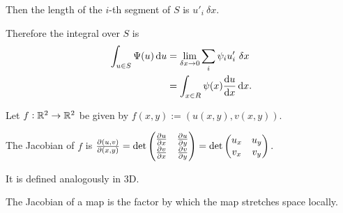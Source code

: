 Then the length of the $i$-th segment of $S$ is $u'_i ~\delta x$.

Therefore the integral over $S$ is
\begin{align*}
  \int_{u \in S} \Psi(u) \du &= \lim_{\delta x \to 0} \sum_i \psi_iu'_i~\delta x\\
                            &= \int_{x \in R} \psi(x)\frac{\du}{\dx}\dx.
\end{align*}

\newpage
\begin{definition*}[Jacobian]
  Let $f:\mathbb{R}^2 \to \mathbb{R}^2$ be given by $f(x, y) := (u(x, y), v(x, y))$.

  The Jacobian of $f$ is
  $
  \frac{\partial(u, v)}{\partial(x, y)} =
  \det \begin{pmatrix}\frac{\partial u}{\partial x} & \frac{\partial u}{\partial y}\\\frac{\partial v}{\partial x} & \frac{\partial v}{\partial y}\\ \end{pmatrix}
  = \det \begin{pmatrix}u_x & u_y\\v_x & v_y\\ \end{pmatrix}.
  $

  It is defined analogously in 3D.
\end{definition*}

\begin{theorem}\label{stretch-factor-is-jacobian}
  The Jacobian of a map is the factor by which the map stretches space locally.
\end{theorem}

